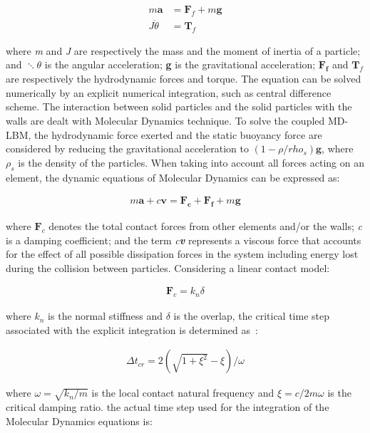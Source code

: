 \begin{align}
\mathit{m}\mathbf{ a} & = \mathbf{F}_{f} + \mathit{m }\mathbf{g} \\
\mathit{J } \ddot{\theta} & = \mathbf{T}_{f}
\end{align}

where \textit{m} and \textit{J} are respectively the mass and the moment of 
inertia of a particle; and $\ddots{\theta}$ is the angular acceleration; 
\textbf{g} is the gravitational acceleration; $\mathbf{F_f}$ and 
$\mathbf{T}_{f}$ are respectively the hydrodynamic forces and torque. The 
equation can be solved numerically by an explicit numerical integration, such 
as central difference scheme. The interaction between solid particles and the 
solid particles with the walls are dealt with Molecular Dynamics technique. To 
solve the coupled MD-LBM, the hydrodynamic force exerted and the static 
buoyancy force are considered by reducing the gravitational acceleration to 
$(1- \rho/rho_{s})\mathbf{g}$, where $\rho_{s}$ is the density of the 
particles. When taking into account all forces acting on an element, the 
dynamic equations of Molecular Dynamics can be expressed as:

\begin{align}
\label{eq:mde}
\mathit{m}\mathbf{a} +\mathit{c}\mathbf{v} = \mathbf{F_c} + \mathbf{F_f} 
+\mathit{m}\mathbf{g}
\end{align} 

where $\mathbf{F}_{c}$ denotes the total contact forces from other elements 
and/or the walls; \textit{c} is a damping coefficient; and the term 
\textit{c\textbf{v}} represents a viscous force that accounts for the effect of 
all possible dissipation forces in the system including energy lost during the 
collision between particles. Considering a linear contact model:

\begin{align}
\mathbf{F}_{c}=\mathit{k}_{\mathit{n}} \delta
\end{align}

where $\mathit{k}_{\mathit{n}}$ is the normal stiffness and $\delta$ is the 
overlap, the critical time step associated with the explicit integration is 
determined as~\citep{He1997}:

\begin{align}
\Delta t_{\mathit{cr}}= 2(\sqrt{1 + \xi^{2}}-\xi) / \omega
\end{align}

where $\omega = \sqrt{\mathit{k}_{\mathit{n}}/\mathit{m}}$ is the local contact 
natural frequency and $\xi = \mathit{c}/2\mathit{m}\omega$ is the critical 
damping ratio. the actual time step used for the integration of the Molecular 
Dynamics equations is:

